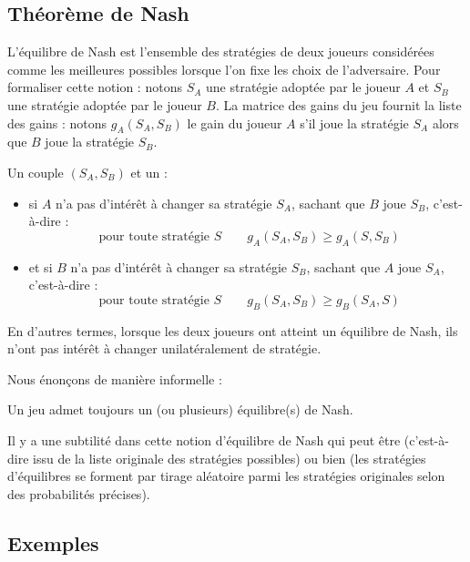 \documentclass[11pt,class=report,crop=false]{standalone}
\begin{document}
\subsection{Théorème de Nash}

L'équilibre de Nash est l'ensemble des stratégies de deux joueurs considérées comme les meilleures possibles lorsque l'on fixe les choix de l'adversaire.
Pour formaliser cette notion : notons $S_A$ une stratégie adoptée par le joueur $A$ et $S_B$ une stratégie adoptée par le joueur $B$.
La matrice des gains du jeu fournit la liste des gains : notons $g_A(S_A, S_B)$ le gain du joueur $A$ s'il joue la stratégie $S_A$ alors que $B$ joue la stratégie $S_B$.



\begin{definition}
Un couple $(S_A, S_B)$ et un  :
\begin{itemize}
	\item si $A$ n'a pas d'intérêt à changer sa stratégie $S_A$, sachant que $B$ joue $S_B$, c'est-à-dire :
	$$\text{ pour toute stratégie } S \qquad g_A(S_A, S_B) \ge g_A(S, S_B)$$
	
	\item et si $B$ n'a pas d'intérêt à changer sa stratégie $S_B$, sachant que $A$ joue $S_A$, c'est-à-dire :
$$\text{ pour toute stratégie } S \qquad g_B(S_A, S_B) \ge g_B(S_A, S)$$	
\end{itemize}	
\end{definition}

En d'autres termes, lorsque les deux joueurs ont atteint un équilibre de Nash, ils n'ont pas intérêt à changer unilatéralement de stratégie.

Nous énonçons de manière informelle :
\begin{theoreme}
	Un jeu admet toujours un (ou plusieurs) équilibre(s) de Nash.
\end{theoreme}

Il y a une subtilité dans cette notion d'équilibre de Nash qui peut être  (c'est-à-dire issu de la liste originale des stratégies possibles) ou bien  (les stratégies d'équilibres se forment par tirage aléatoire parmi les stratégies originales selon des probabilités précises).



\subsection{Exemples}
\end{document}
